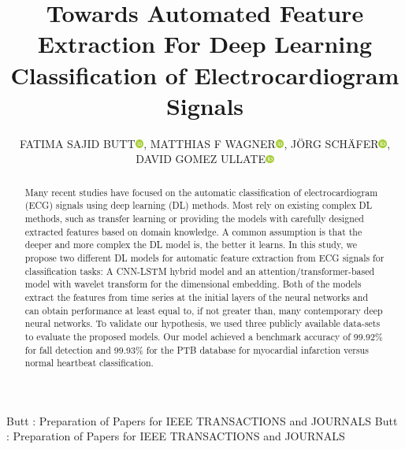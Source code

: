 \documentclass{ieeeaccess}
\newcommand{\orcid}[1]{\href{https://orcid.org/#1}{\includegraphics[width=8pt]{Definitions/preview.png}}}
\begin{document}

\title{Towards Automated Feature Extraction For Deep Learning Classification of Electrocardiogram Signals}
\author{\uppercase{Fatima Sajid Butt}\orcid{0000-0002-9111-7305},
\uppercase{Matthias F Wagner}\orcid{0000-0002-8702-9257},
\uppercase{Jörg Schäfer}\orcid{0000-0003-4797-0306},
\uppercase{David Gomez Ullate}\orcid{0000-0002-6890-6584}}
\address[1]{Frankfurt University of Applied Sciences, Nibelungenpl. 1, 60318 Frankfurt am Main, Germany (e-mail: fbutt@fb2.fra-uas.de)}
\address[2]{Escuela Superior de Ingeniería, Universidad de Cádiz, 11001 Cádiz, Spain (e-mail: fatima.sajidbutt@alum.uca.es)}
\address[3]{Frankfurt University of Applied Sciences, Nibelungenpl. 1, 60318 Frankfurt am Main, Germany (e-mail: jschaefer@fb2.fra-uas.de9}
\address[4]{Frankfurt University of Applied Sciences, Nibelungenpl. 1, 60318 Frankfurt am Main, Germany (e-mail: mfwagner@fb2.fra-uas.de)}
\address[5]{Escuela Superior de Ingeniería, Universidad de Cádiz, 11001 Cádiz, Spain (e-mail: david.gomezullate@uca.es)}
\address[6]{School of Science and Technology, IE University, Madrid, Spain (e-mail: david.gomezullate@ie.edu)}


\markboth
{Butt \headeretal: Preparation of Papers for IEEE TRANSACTIONS and JOURNALS}
{Butt \headeretal: Preparation of Papers for IEEE TRANSACTIONS and JOURNALS}


\begin{abstract}
Many recent studies have focused on the automatic classification of electrocardiogram (ECG) signals using deep learning (DL) methods. Most rely on existing complex DL methods, such as transfer learning or providing the models with carefully designed extracted features based on domain knowledge. A common assumption is that the deeper and more complex the DL model is, the better it learns. In this study, we propose two different DL models for automatic feature extraction from ECG signals for classification tasks: A CNN-LSTM hybrid model and an attention/transformer-based model with wavelet transform for the dimensional embedding. Both of the models extract the features from time series at the initial layers of the neural networks and can obtain performance at least equal to, if not greater than, many contemporary deep neural networks. To validate our hypothesis, we used three publicly available data-sets to evaluate the proposed models. Our model achieved a benchmark accuracy of 99.92\% for fall detection and 99.93\% for the PTB database for myocardial infarction versus normal heartbeat classification.
\end{abstract}
\end{document}
